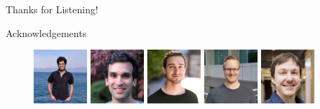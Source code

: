 \documentclass[mathserif,notheorems, hyperref={colorlinks, citecolor=blue, urlcolor=blue, linkcolor=blue}]{beamer}
\begin{document}

    \begin{frame}{}
        \begin{center}
        \huge Thanks for Listening!
        \end{center}
    \end{frame}



    \begin{frame}{Acknowledgements}
     
        \begin{figure}
            \centering
            \includegraphics[width=0.18\textwidth]{collaborators/sharan}
            \includegraphics[width=0.18\textwidth]{collaborators/issam}
            \includegraphics[width=0.18\textwidth]{collaborators/gauthier}
            \includegraphics[width=0.18\textwidth]{collaborators/mark}
            \includegraphics[width=0.18\textwidth]{collaborators/simon}

            \vspace{0.4ex}%


\end{figure}
\end{frame}
\end{document}
